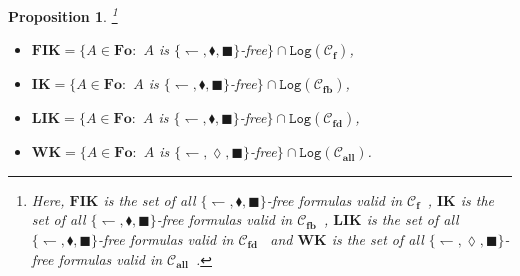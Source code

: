 \documentclass[draft]{article}
\newtheorem{proposition}{Proposition}
\newenvironment{proof}{{\bf Proof:}}{~$\dashv$\\}
\def\WK{\mathbf{WK}}
\def\LIK{\mathbf{LIK}}
\def\FIK{\mathbf{FIK}}
\def\Fo{\mathbf{Fo}}
\def\allfra{\mathbf{all}}
\def\fcfra{\mathbf{f}}
\def\fbcfra{\mathbf{fb}}
\def\fdcfra{\mathbf{fd}}
\def\IK{\mathbf{IK}}
\def\Log{\mathtt{Log}}
\begin{document}
\begin{proposition}\footnote{Here, $\FIK$ is the set of all $\{{\leftharpoondown},{\blacklozenge},{\blacksquare}\}$-free formulas valid in ${\mathcal C}_{\fcfra}$~\cite{Balbiani:et:al:2024a}, $\IK$ is the set of all $\{{\leftharpoondown},{\blacklozenge},{\blacksquare}\}$-free formulas valid in ${\mathcal C}_{\fbcfra}$~\cite{FischerServi:1984}, $\LIK$ is the set of all $\{{\leftharpoondown},{\blacklozenge},{\blacksquare}\}$-free formulas valid in ${\mathcal C}_{\fdcfra}$~\cite{Balbiani:et:al:2024b} and $\WK$ is the set of all $\{{\leftharpoondown},{\lozenge},{\blacksquare}\}$-free formulas valid in ${\mathcal C}_{\allfra}$~\cite{Wijesekera:1990}.}
%
%
\begin{itemize}
%
%
\item $\FIK{=}\{A{\in}\Fo:$ $A$ is $\{{\leftharpoondown},{\blacklozenge},{\blacksquare}\}$-free$\}{\cap}\Log({\mathcal C}_{\fcfra})$,
%
%
\item $\IK{=}\{A{\in}\Fo:$ $A$ is $\{{\leftharpoondown},{\blacklozenge},{\blacksquare}\}$-free$\}{\cap}\Log({\mathcal C}_{\fbcfra})$,
%
%
\item $\LIK{=}\{A{\in}\Fo:$ $A$ is $\{{\leftharpoondown},{\blacklozenge},{\blacksquare}\}$-free$\}{\cap}\Log({\mathcal C}_{\fdcfra})$,
%
%
\item $\WK{=}\{A{\in}\Fo:$ $A$ is $\{{\leftharpoondown},{\lozenge},{\blacksquare}\}$-free$\}{\cap}\Log({\mathcal C}_{\allfra})$.
%
%
\end{itemize}
%
%
\end{proposition}
%
%
%
%
%
%
%
%
%
%
\end{document}
